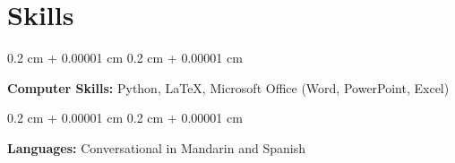\documentclass[10pt, letterpaper]{article}
\newenvironment{onecolentry}{
    \begin{adjustwidth}{
        0.2 cm + 0.00001 cm
    }{
        0.2 cm + 0.00001 cm
    }
}{
    \end{adjustwidth}
} %
\newenvironment{twocolentry}[2][]{
    \onecolentry
    \def\secondColumn{#2}
    \setcolumnwidth{\fill, 4.5 cm}
    \begin{paracol}{2}
}{
    \switchcolumn \raggedleft \secondColumn
    \end{paracol}
    \endonecolentry
} %
\let\hrefWithoutArrow\href
\renewcommand{\href}[2]{\hrefWithoutArrow{#1}{\ifthenelse{\equal{#2}{}}{ }{#2 }\raisebox{.15ex}{\footnotesize \faExternalLink*}}}
\begin{document}
    
    
    \section{Skills}



        
        \begin{onecolentry}
            \textbf{Computer Skills:} Python, LaTeX, Microsoft Office (Word, PowerPoint, Excel)
        \end{onecolentry}
        \begin{onecolentry}
            \textbf{Languages:} Conversational in Mandarin and Spanish
        \end{onecolentry}

        

    

 
        
  
   



    



        







    
\end{document}
